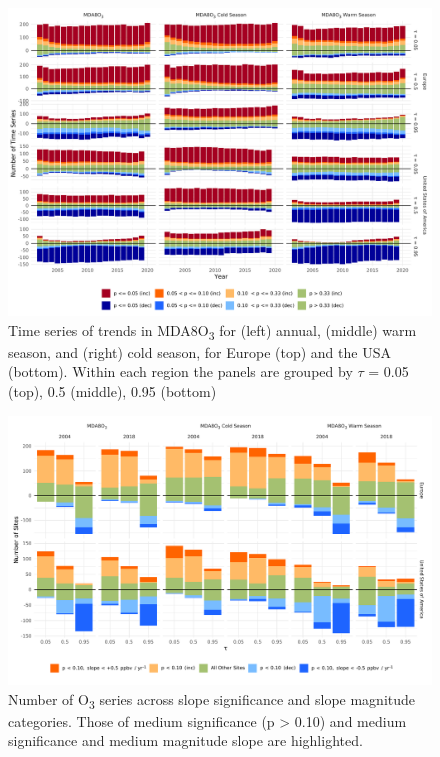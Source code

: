 \documentclass[journal abbreviation, manuscript]{copernicus}
\begin{document}

\begin{figure}[p]
\centering
\includegraphics[width=\textwidth]{figures/paper_figures/f03_signifcance_bars.pdf}
\caption{Time series of trends in MDA8O\textsubscript{3} for (left) annual, (middle) warm season, and (right) cold season, for Europe (top) and the USA (bottom). Within each region the panels are grouped by $\tau$ = 0.05 (top), 0.5 (middle), 0.95 (bottom)}
\label{fig:signifcance_bars}
\end{figure}
\clearpage

\begin{figure}[p]
\includegraphics[width=18cm]{figures/paper_figures/f04_slope_sig_counts.pdf}
\caption{Number of O\textsubscript{3} series across slope significance and slope magnitude categories. Those of medium significance (p > 0.10) and medium significance and medium magnitude slope are highlighted.}
\label{fig:slope_sig_counts}
\end{figure}
\clearpage
\end{document}
